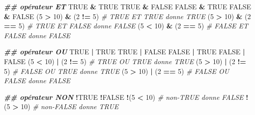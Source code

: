 \documentclass[
]{book}
\newenvironment{Shaded}{\begin{snugshade}}{\end{snugshade}}
\newcommand{\CommentTok}[1]{\textcolor[rgb]{0.56,0.35,0.01}{\textit{#1}}}
\newcommand{\ConstantTok}[1]{\textcolor[rgb]{0.56,0.35,0.01}{#1}}
\newcommand{\DecValTok}[1]{\textcolor[rgb]{0.00,0.00,0.81}{#1}}
\newcommand{\DocumentationTok}[1]{\textcolor[rgb]{0.56,0.35,0.01}{\textbf{\textit{#1}}}}
\newcommand{\NormalTok}[1]{#1}
\newcommand{\SpecialCharTok}[1]{\textcolor[rgb]{0.81,0.36,0.00}{\textbf{#1}}}
\begin{document}
\begin{Shaded}
\begin{Highlighting}[]
\DocumentationTok{\#\# opérateur ET}
\ConstantTok{TRUE} \SpecialCharTok{\&} \ConstantTok{TRUE}
\ConstantTok{TRUE} \SpecialCharTok{\&} \ConstantTok{FALSE}
\ConstantTok{FALSE} \SpecialCharTok{\&} \ConstantTok{TRUE}
\ConstantTok{FALSE} \SpecialCharTok{\&} \ConstantTok{FALSE}
\NormalTok{(}\DecValTok{5} \SpecialCharTok{\textgreater{}} \DecValTok{10}\NormalTok{) }\SpecialCharTok{\&}\NormalTok{ (}\DecValTok{2} \SpecialCharTok{!=} \DecValTok{5}\NormalTok{) }\CommentTok{\# TRUE ET TRUE donne TRUE}
\NormalTok{(}\DecValTok{5} \SpecialCharTok{\textgreater{}} \DecValTok{10}\NormalTok{) }\SpecialCharTok{\&}\NormalTok{ (}\DecValTok{2} \SpecialCharTok{==} \DecValTok{5}\NormalTok{) }\CommentTok{\# TRUE ET FALSE donne FALSE}
\NormalTok{(}\DecValTok{5} \SpecialCharTok{\textless{}} \DecValTok{10}\NormalTok{) }\SpecialCharTok{\&}\NormalTok{ (}\DecValTok{2} \SpecialCharTok{==} \DecValTok{5}\NormalTok{) }\CommentTok{\# FALSE ET FALSE donne FALSE}

\DocumentationTok{\#\# opérateur OU}
\ConstantTok{TRUE} \SpecialCharTok{|} \ConstantTok{TRUE}
\ConstantTok{TRUE} \SpecialCharTok{|} \ConstantTok{FALSE}
\ConstantTok{FALSE} \SpecialCharTok{|} \ConstantTok{TRUE}
\ConstantTok{FALSE} \SpecialCharTok{|} \ConstantTok{FALSE}
\NormalTok{(}\DecValTok{5} \SpecialCharTok{\textless{}} \DecValTok{10}\NormalTok{) }\SpecialCharTok{|}\NormalTok{ (}\DecValTok{2} \SpecialCharTok{!=} \DecValTok{5}\NormalTok{) }\CommentTok{\# TRUE OU TRUE donne TRUE}
\NormalTok{(}\DecValTok{5} \SpecialCharTok{\textgreater{}} \DecValTok{10}\NormalTok{) }\SpecialCharTok{|}\NormalTok{ (}\DecValTok{2} \SpecialCharTok{!=} \DecValTok{5}\NormalTok{) }\CommentTok{\# FALSE OU TRUE donne TRUE}
\NormalTok{(}\DecValTok{5} \SpecialCharTok{\textgreater{}} \DecValTok{10}\NormalTok{) }\SpecialCharTok{|}\NormalTok{ (}\DecValTok{2} \SpecialCharTok{==} \DecValTok{5}\NormalTok{) }\CommentTok{\# FALSE OU FALSE donne FALSE}

\DocumentationTok{\#\# opérateur NON}
\SpecialCharTok{!}\ConstantTok{TRUE}
\SpecialCharTok{!}\ConstantTok{FALSE}
\SpecialCharTok{!}\NormalTok{(}\DecValTok{5} \SpecialCharTok{\textless{}} \DecValTok{10}\NormalTok{) }\CommentTok{\# non{-}TRUE donne FALSE}
\SpecialCharTok{!}\NormalTok{(}\DecValTok{5} \SpecialCharTok{\textgreater{}} \DecValTok{10}\NormalTok{) }\CommentTok{\# non{-}FALSE donne TRUE }
\end{Highlighting}
\end{Shaded}
\end{document}
